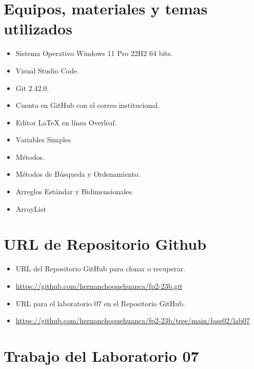 \documentclass{article}
\begin{document}
	\section{Equipos, materiales y temas utilizados}
	\begin{itemize}
		\item Sistema Operativo Windows 11 Pro 22H2 64 bits.
		\item Visual Studio Code.
		\item Git 2.42.0.
		\item Cuenta en GitHub con el correo institucional.
        \item Editor LaTeX en línea Overleaf.
        \item Variables Simples
        \item Métodos.
        \item Métodos de Búsqueda y Ordenamiento.
        \item Arreglos Estándar y Bidimensionales.
        \item ArrayList
        
        
	\end{itemize}
	
	\section{URL de Repositorio Github}
	\begin{itemize}
		\item URL del Repositorio GitHub para clonar o recuperar.
        \item \url{https://github.com/hernanchoquehuanca/fp2-23b.git}
		\item URL para el laboratorio 07 en el Repositorio GitHub.
		\item \url{https://github.com/hernanchoquehuanca/fp2-23b/tree/main/fase02/lab07}
	\end{itemize}
	
	\section{Trabajo del Laboratorio 07}
        
        

\end{document}
